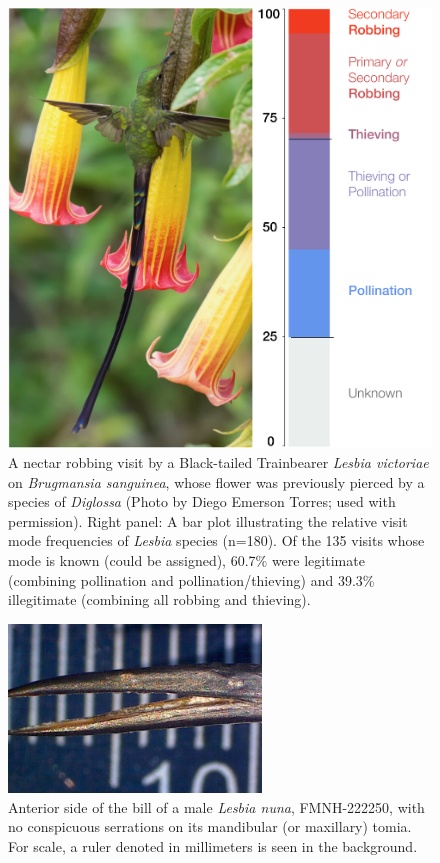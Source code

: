 \documentclass[fleqn,10pt,lineno]{wlpeerj}
\begin{document}
\begin{figure}[ht]
\centering
\includegraphics[width=1\textwidth]{fig1/marauding_lesbias_fig_1b.pdf}
\caption{A nectar robbing visit by a Black-tailed Trainbearer \textit{Lesbia victoriae} on \textit{Brugmansia sanguinea}, whose flower was previously pierced by a species of \textit{Diglossa} (Photo by Diego Emerson Torres; used with permission). Right panel: A bar plot illustrating the relative visit mode frequencies of \textit{Lesbia} species (n=180). Of the 135 visits whose mode is known (could be assigned), 60.7\% were legitimate (combining pollination and pollination/thieving) and 39.3\% illegitimate (combining all robbing and thieving).}
\label{fig:fig1}
\end{figure}

\pagebreak

\begin{figure}[ht]
\begin{center}
\includegraphics[width=0.6\textwidth]{fig2/Lesbia-nuna-FMNH-222250-1-Male.jpeg}
\caption{Anterior side of the bill of a male \textit{Lesbia nuna}, FMNH-222250, with no conspicuous serrations on its mandibular (or maxillary) tomia. For scale, a ruler denoted in millimeters is seen in the background.}
\label{fig:fig2}
\end{center}
\end{figure}
\end{document}
